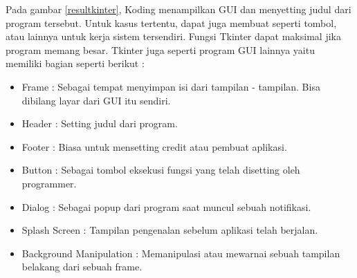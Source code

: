 Pada gambar \ref{resultkinter}, Koding menampilkan GUI dan menyetting judul dari program tersebut. Untuk kasus tertentu, dapat juga membuat seperti tombol, atau lainnya untuk kerja sistem tersendiri. Fungsi Tkinter dapat maksimal jika program memang besar. Tkinter juga seperti program GUI lainnya yaitu memiliki bagian seperti berikut : 
\begin{itemize}
	\item Frame : Sebagai tempat menyimpan isi dari tampilan - tampilan. Bisa dibilang layar dari GUI itu sendiri.	
	\item Header : Setting judul dari program.
	\item Footer : Biasa untuk mensetting credit atau pembuat aplikasi.
	\item Button : Sebagai tombol eksekusi fungsi yang telah disetting oleh programmer.
	\item Dialog : Sebagai popup dari program saat muncul sebuah notifikasi.
	\item Splash Screen : Tampilan pengenalan sebelum aplikasi telah berjalan.
	\item Background Manipulation : Memanipulasi atau mewarnai sebuah tampilan belakang dari sebuah frame.
\end{itemize}

